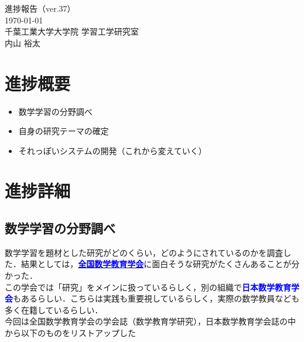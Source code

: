 \documentclass[a4paper,12pt]{ltjsarticle}
\newcommand{\important}[1]{\textcolor{blue}{\textbf{#1}}}
\begin{document}
\begin{center}
  {\huge 進捗報告（ver.37）}\\[1em]
  {\large \today}\\
  {\large 千葉工業大学大学院 学習工学研究室}\\
  {\large 内山 裕太}
\end{center}

\vspace{2em}

\section{進捗概要}
\begin{itemize}
  \item 数学学習の分野調べ
  \item 自身の研究テーマの確定
  \item それっぽいシステムの開発（これから変えていく）
\end{itemize}
\newpage

\section{進捗詳細}
\subsection{数学学習の分野調べ}
数学学習を題材とした研究がどのくらい，どのようにされているのかを調査した．結果としては，\href{https://www.jstage.jst.go.jp/browse/jasme/29/0/_contents/-char/ja}{\important{全国数学教育学会}}に面白そうな研究がたくさんあることが分かった．\\

この学会では「研究」をメインに扱っているらしく，別の組織で\important{日本数学教育学会}もあるらしい．こちらは実践も重要視しているらしく，実際の数学教員なども多く在籍しているらしい．\\

今回は全国数学教育学会の学会誌（数学教育学研究），日本数学教育学会誌の中から以下のものをリストアップした
\end{document}
